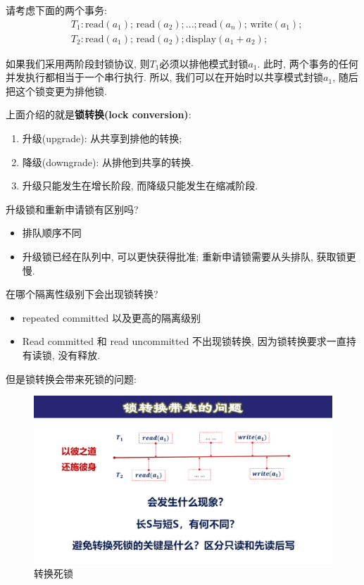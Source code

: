 请考虑下面的两个事务:
\begin{align*}
    &T_1: \text{read}(a_1);\,\text{read}(a_2);...;\text{read}(a_n);\,\text{write}(a_1); \\
    &T_2: \text{read}(a_1);\,\text{read}(a_2);\text{display}(a_1+a_2);
\end{align*}

如果我们采用两阶段封锁协议, 则$T_1$必须以排他模式封锁$a_1$. 此时, 两个事务的任何并发执行都相当于一个串行执行. 所以, 我们可以在开始时以共享模式封锁$a_1$, 随后把这个锁变更为排他锁.

上面介绍的就是\textbf{锁转换(lock conversion)}:
\begin{enumerate}
    \item 升级(upgrade): 从共享到排他的转换;
    \item 降级(downgrade): 从排他到共享的转换.
    \item 升级只能发生在增长阶段, 而降级只能发生在缩减阶段.
\end{enumerate}

\begin{problem}
  升级锁和重新申请锁有区别吗?
\end{problem}

\begin{itemize}
  \item 排队顺序不同
  \item 升级锁已经在队列中, 可以更快获得批准; 重新申请锁需要从头排队, 获取锁更慢.
\end{itemize}

\begin{problem}
  在哪个隔离性级别下会出现锁转换?
\end{problem}
\begin{itemize}
  \item repeated committed 以及更高的隔离级别
  \item Read committed 和 read uncommitted 不出现锁转换, 因为锁转换要求一直持有读锁, 没有释放.
\end{itemize}

但是锁转换会带来死锁的问题: 
\begin{figure}[H]
    \centering
    \includegraphics[width=.6\textwidth]{figure/并发控制-锁转换.pdf}
    \caption{转换死锁}
\end{figure}

